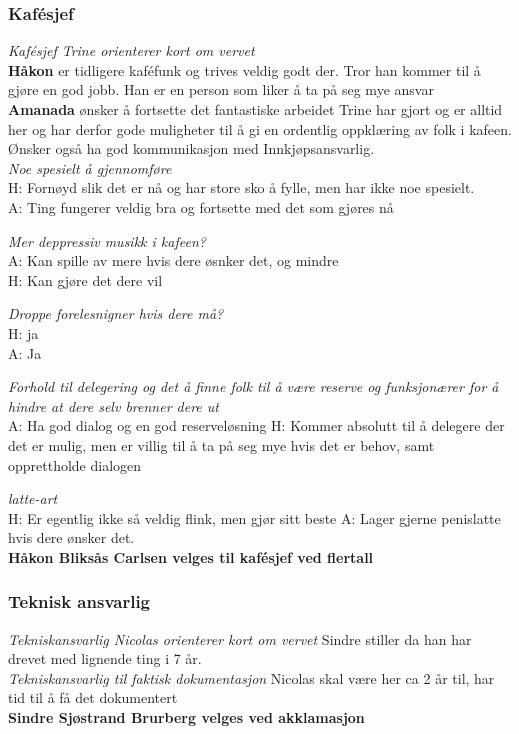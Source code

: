 \documentclass[10pt,norsk,a4paper]{article}
\begin{document}
\begin{multicols}{2}
\subsubsection{Kafésjef}
\textit{Kafésjef Trine orienterer kort om vervet}\\
\textbf{Håkon} er tidligere kaféfunk og trives veldig godt der. Tror han
kommer til å gjøre en god jobb. Han er en person som liker å ta på seg mye
ansvar\\
\textbf{Amanada} ønsker å fortsette det fantastiske arbeidet Trine har gjort og er
alltid her og har derfor gode muligheter til å gi en ordentlig oppklæring av
folk i kafeen. Ønsker også ha god kommunikasjon med Innkjøpsansvarlig.\\
\textit{Noe spesielt å gjennomføre}\\
H: Fornøyd slik det er nå og har store sko å fylle, men har ikke noe
spesielt.\\
A: Ting fungerer veldig bra og fortsette med det som gjøres nå

\textit{Mer deppressiv musikk i kafeen?}\\
A: Kan spille av mere hvis dere øsnker det, og mindre\\
H: Kan gjøre det dere vil

\textit{Droppe forelesnigner hvis dere må?}\\
H: ja\\
A: Ja

\textit{Forhold til delegering og det å finne folk til å være reserve og
funksjonærer for å hindre at dere selv brenner dere ut}\\
A: Ha god dialog og en god reserveløsning
H: Kommer absolutt til å delegere der det er mulig, men er villig til å ta på
seg mye hvis det er behov, samt opprettholde dialogen

\textit{latte-art}\\
H: Er egentlig ikke så veldig flink, men gjør sitt beste
A: Lager gjerne penislatte hvis dere ønsker det.\\
\textbf{Håkon Bliksås Carlsen velges til kafésjef ved flertall}

\subsubsection{Teknisk ansvarlig}
\textit{Tekniskansvarlig Nicolas orienterer kort om vervet}
Sindre stiller da han har drevet med lignende ting i 7 år.\\
\textit{Tekniskansvarlig til faktisk dokumentasjon}
Nicolas skal være her ca 2 år til, har tid til å få det dokumentert\\
\textbf{Sindre Sjøstrand Brurberg velges ved akklamasjon}


\end{multicols}
\end{document}
